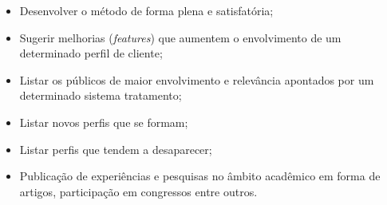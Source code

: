 \documentclass[12pt]{article}
\begin{document}
\begin{itemize}[label={\checkmark}]
    \item Desenvolver o método de forma plena e satisfatória;
    \item Sugerir melhorias (\textit{features}) que aumentem o envolvimento de um determinado perfil de cliente;
    \item Listar os públicos de maior envolvimento e relevância apontados por um determinado sistema tratamento;
    \item Listar novos perfis que se formam;
    \item Listar perfis que tendem a desaparecer;
    \item Publicação de experiências e pesquisas no âmbito acadêmico em forma de artigos, participação em congressos entre outros.
\end{itemize}



\end{document}
